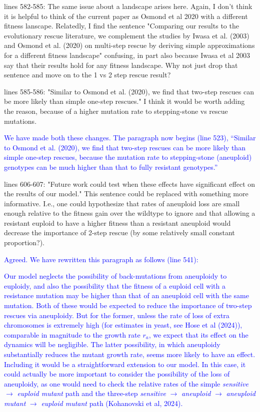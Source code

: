 \documentclass[12pt]{extarticle}
\begin{document}
lines 582-585: The same issue about a landscape arises here. Again, I don't think it is helpful to think of the current paper as Osmond et al 2020 with a different fitness lanscape. Relatedly, I find the sentence "Comparing our results to the evolutionary rescue literature, we complement the studies by Iwasa et al. (2003) and Osmond et al. (2020) on multi-step rescue by deriving simple approximations for a different fitness landscape" confusing, in part also because Iwasa et al 2003 say that their results hold for any fitness landscape. Why not just drop that sentence and move on to the 1 vs 2 step rescue result?

lines 585-586: "Similar to Osmond et al. (2020), we find that two-step rescues can be more likely than simple one-step rescues." I think it would be worth adding the reason, because of a higher mutation rate to stepping-stone vs rescue mutations.

\textcolor{blue}{We have made both these changes. The paragraph now begins (line 523), ``Similar to Osmond et al. (2020), we find that two-step rescues can be more likely than simple one-step rescues, because the mutation rate to stepping-stone (aneuploid) genotypes can be much higher than that to fully resistant genotypes.''}

lines 606-607: "Future work could test when these effects have significant effect on the results of our model." This sentence could be replaced with something more informative. I.e., one could hypothesize that rates of aneuploid loss are small enough relative to the fitness gain over the wildtype to ignore and that allowing a resistant euploid to have a higher fitness than a resistant aneuploid would decrease the importance of 2-step rescue (by some relatively small constant proportion?).

\textcolor{blue}{Agreed. We have rewritten this paragraph as follows (line 541):
\begin{displayquote}
    Our model neglects the possibility of back-mutations from aneuploidy to euploidy, and also the possibility that the fitness of a euploid cell with a resistance mutation may be higher than that of an aneuploid cell with the same mutation. 
    Both of these would be expected to reduce the importance of two-step rescues via aneuploidy.
    But for the former, unless the rate of loss of extra chromosomes is extremely high (for estimates in yeast, see Hose et al (2024)), comparable in magnitude to the growth rate $r_a$, we expect that its effect on the dynamics will be negligible.
    The latter possibility, in which aneuploidy substantially reduces the mutant growth rate, seems more likely
    to have an effect. 
    Including it would be a straightforward extension to our model.
    In this case, it could actually be more important to consider the possibility of the loss of aneuploidy, 
    as one would need to check the relative rates of the simple \textit{sensitive} $\rightarrow$ \textit{euploid mutant} path and the three-step \textit{sensitive} $\rightarrow$ \textit{aneuploid} $\rightarrow$ \textit{aneuploid mutant} $\rightarrow$ \textit{euploid mutant} path (Kohanovski et al, 2024).
\end{displayquote}
}
\end{document}
